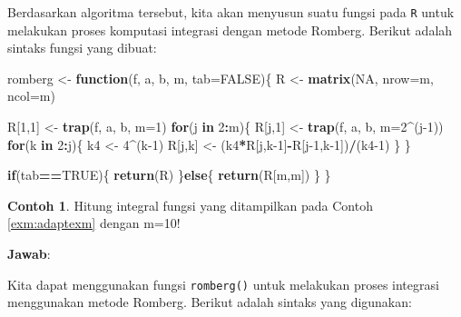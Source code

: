 \documentclass[
]{book}
\newenvironment{Shaded}{\begin{snugshade}}{\end{snugshade}}
\newcommand{\AttributeTok}[1]{\textcolor[rgb]{0.13,0.29,0.53}{#1}}
\newcommand{\ConstantTok}[1]{\textcolor[rgb]{0.56,0.35,0.01}{#1}}
\newcommand{\ControlFlowTok}[1]{\textcolor[rgb]{0.13,0.29,0.53}{\textbf{#1}}}
\newcommand{\DecValTok}[1]{\textcolor[rgb]{0.00,0.00,0.81}{#1}}
\newcommand{\FunctionTok}[1]{\textcolor[rgb]{0.13,0.29,0.53}{\textbf{#1}}}
\newcommand{\NormalTok}[1]{#1}
\newcommand{\OtherTok}[1]{\textcolor[rgb]{0.56,0.35,0.01}{#1}}
\newcommand{\SpecialCharTok}[1]{\textcolor[rgb]{0.81,0.36,0.00}{\textbf{#1}}}
\theoremstyle{definition}
\theoremstyle{definition}
\newtheorem{example}{Contoh}[chapter]
\theoremstyle{definition}
\theoremstyle{definition}
\theoremstyle{remark}
\begin{document}
Berdasarkan algoritma tersebut, kita akan menyusun suatu fungsi pada \texttt{R} untuk melakukan proses komputasi integrasi dengan metode Romberg. Berikut adalah sintaks fungsi yang dibuat:

\begin{Shaded}
\begin{Highlighting}[]
\NormalTok{romberg }\OtherTok{\textless{}{-}} \ControlFlowTok{function}\NormalTok{(f, a, b, m, }\AttributeTok{tab=}\ConstantTok{FALSE}\NormalTok{)\{}
\NormalTok{  R }\OtherTok{\textless{}{-}} \FunctionTok{matrix}\NormalTok{(}\ConstantTok{NA}\NormalTok{, }\AttributeTok{nrow=}\NormalTok{m, }\AttributeTok{ncol=}\NormalTok{m)}
  
\NormalTok{  R[}\DecValTok{1}\NormalTok{,}\DecValTok{1}\NormalTok{] }\OtherTok{\textless{}{-}} \FunctionTok{trap}\NormalTok{(f, a, b, }\AttributeTok{m=}\DecValTok{1}\NormalTok{)}
  \ControlFlowTok{for}\NormalTok{(j }\ControlFlowTok{in} \DecValTok{2}\SpecialCharTok{:}\NormalTok{m)\{}
\NormalTok{    R[j,}\DecValTok{1}\NormalTok{] }\OtherTok{\textless{}{-}} \FunctionTok{trap}\NormalTok{(f, a, b, }\AttributeTok{m=}\DecValTok{2}\SpecialCharTok{\^{}}\NormalTok{(j}\DecValTok{{-}1}\NormalTok{))}
    \ControlFlowTok{for}\NormalTok{(k }\ControlFlowTok{in} \DecValTok{2}\SpecialCharTok{:}\NormalTok{j)\{}
\NormalTok{      k4 }\OtherTok{\textless{}{-}} \DecValTok{4}\SpecialCharTok{\^{}}\NormalTok{(k}\DecValTok{{-}1}\NormalTok{)}
\NormalTok{      R[j,k] }\OtherTok{\textless{}{-}}\NormalTok{ (k4}\SpecialCharTok{*}\NormalTok{R[j,k}\DecValTok{{-}1}\NormalTok{]}\SpecialCharTok{{-}}\NormalTok{R[j}\DecValTok{{-}1}\NormalTok{,k}\DecValTok{{-}1}\NormalTok{])}\SpecialCharTok{/}\NormalTok{(k4}\DecValTok{{-}1}\NormalTok{)}
\NormalTok{    \}}
\NormalTok{  \}}
  
  \ControlFlowTok{if}\NormalTok{(tab}\SpecialCharTok{==}\ConstantTok{TRUE}\NormalTok{)\{}
    \FunctionTok{return}\NormalTok{(R)}
\NormalTok{  \}}\ControlFlowTok{else}\NormalTok{\{}
    \FunctionTok{return}\NormalTok{(R[m,m])}
\NormalTok{  \}}
\NormalTok{\}}
\end{Highlighting}
\end{Shaded}

\begin{example}
\protect\hypertarget{exm:rombergexm}{}\label{exm:rombergexm}Hitung integral fungsi yang ditampilkan pada Contoh \ref{exm:adaptexm} dengan m=10!
\end{example}

\textbf{Jawab}:

Kita dapat menggunakan fungsi \texttt{romberg()} untuk melakukan proses integrasi menggunakan metode Romberg. Berikut adalah sintaks yang digunakan:
\end{document}
